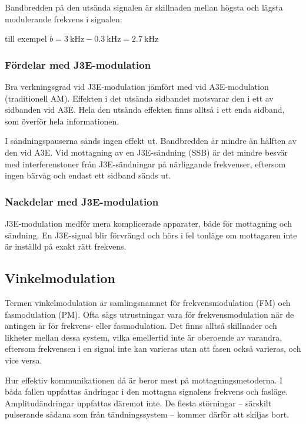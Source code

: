 Bandbredden på den utsända signalen är skillnaden mellan högsta och lägsta
modulerande frekvens i signalen:

till exempel \(b = \qty{3}{\kilo\hertz} - \qty{0,3}{\kilo\hertz} =
\qty{2,7}{\kilo\hertz}\)

\subsubsection{Fördelar med J3E-modulation}
Bra verkningsgrad vid J3E-modulation jämfört med vid A3E-modulation
(traditionell AM).
Effekten i det utsända sidbandet motsvarar den i ett av sidbanden vid A3E.
Hela den utsända effekten finns alltså i ett enda sidband,
som överför hela informationen.

I sändningspauserna sänds ingen effekt ut.
Bandbredden är mindre än hälften av den vid A3E.
Vid mottagning av en J3E-sändning (SSB) är det mindre besvär med
interferenstoner från J3E-sändningar på närliggande frekvenser, eftersom ingen
bärvåg och endast ett sidband sänds ut.

\subsubsection{Nackdelar med J3E-modulation}
J3E-modulation medför mera komplicerade apparater, både för mottagning och
sändning.
En J3E-signal blir förvrängd och hörs i fel tonläge om mottagaren
inte är inställd på exakt rätt frekvens.

\subsection{Vinkelmodulation}
\label{modulation_vinkel}

Termen vinkelmodulation är samlingsnamnet för frekvensmodulation (FM) och
fasmodulation (PM).
Ofta sägs utrustningar vara för frekvensmodulation när de antingen är för
frekvens- eller fasmodulation.
Det finns alltså skillnader och likheter mellan dessa system, vilka emellertid
inte är oberoende av varandra, eftersom frekvensen i en signal inte kan
varieras utan att fasen också varieras, och vice versa.

Hur effektiv kommunikationen då är beror mest på mottagningsmetoderna.
I båda fallen uppfattas ändringar i den mottagna signalens frekvens och fasläge.
Amplitudändringar uppfattas däremot inte.
De flesta störningar -- särskilt pulserande sådana som från tändningssystem --
kommer därför att skiljas bort.

